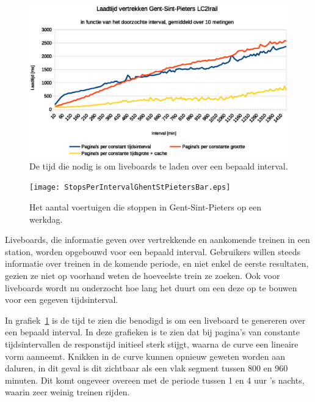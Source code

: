 \begin{figure}[h]
	\centering
	\includegraphics[width=1.0\textwidth]{images/Laadtijd_vertrekken.eps}
	\caption[Laadtijd liveboards in functie van het overlopen interval]{De tijd die nodig is om liveboards te laden over een bepaald interval.}
	\label{fig:responsetimeperintervalliveboards}
\end{figure}

\begin{figure}[h]
	\centering
	\texttt{[image: StopsPerIntervalGhentStPietersBar.eps]}
	\caption[Het aantal voertuigen die stoppen in Gent-St-Pieters]{Het aantal voertuigen die stoppen in Gent-Sint-Pieters op een werkdag.}
	\label{fig:stopsperintervaldetail}
\end{figure}

Liveboards, die informatie geven over vertrekkende en aankomende treinen in een station, worden opgebouwd voor een bepaald interval. Gebruikers willen steeds informatie over treinen in de komende periode, en niet enkel de eerste resultaten, gezien ze niet op voorhand weten de hoeveelste trein ze zoeken. Ook voor liveboards wordt nu onderzocht hoe lang het duurt om een deze op te bouwen voor een gegeven tijdsinterval.

In grafiek~\ref{fig:responsetimeperintervalliveboards} is de tijd te zien die benodigd is om een liveboard te genereren over een bepaald interval. In deze grafieken is te zien dat bij pagina's van constante tijdsintervallen de responstijd initieel sterk stijgt, waarna de curve een lineaire vorm aanneemt. Knikken in de curve kunnen opnieuw geweten worden aan daluren, in dit geval is dit zichtbaar als een vlak segment tussen 800 en 960 minuten. Dit komt ongeveer overeen met de periode tussen 1 en 4 uur 's nachts, waarin zeer weinig treinen rijden. 

